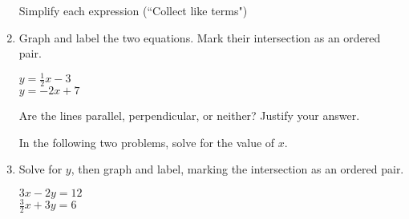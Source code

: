 \documentclass[12pt, twoside]{article}
\begin{document}
\begin{enumerate}
  Simplify each expression (``Collect like terms")
  
  
\newpage

\item Graph and label the two equations. Mark their intersection as an ordered pair.

  \begin{multicols}{2}
    $y = \frac{1}{2}x-3$ \\
    $y = -2x + 7$
  \end{multicols}
  Are the lines parallel, perpendicular, or neither? Justify your answer.
  \vspace{1.5cm}

  \begin{center} %
  \end{center}

  In the following two problems, solve for the value of $x$.

\newpage
  \item Solve for $y$, then graph and label, marking the intersection as an ordered pair.
        \vspace{0.25cm}
        \begin{multicols}{2}
          $3x - 2y =  12$\\
          $\displaystyle \frac{3}{2} x + 3y = 6$
        \end{multicols}
        \vspace{2.25cm}

    \begin{center} %
    \end{center}


\end{enumerate}
\end{document}
